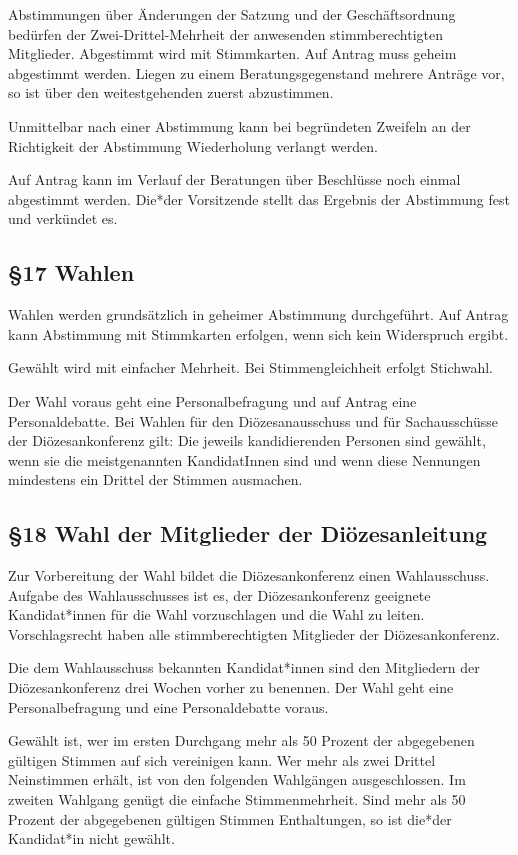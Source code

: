 \documentclass[12pt]{report}
\begin{document}
\begin{flushleft}
Abstimmungen über Änderungen der Satzung und der Geschäftsordnung bedürfen der
Zwei-Drittel-Mehrheit der anwesenden stimmberechtigten Mitglieder. Abgestimmt wird mit Stimmkarten.
Auf Antrag muss geheim abgestimmt werden.
Liegen zu einem Beratungsgegenstand mehrere Anträge vor, so ist über den weitestgehenden zuerst abzustimmen.

Unmittelbar nach einer Abstimmung kann bei begründeten Zweifeln an der Richtigkeit der Abstimmung 
Wiederholung verlangt werden.

Auf Antrag kann im Verlauf der Beratungen über Beschlüsse noch einmal abgestimmt werden.
Die*der Vorsitzende stellt das Ergebnis der Abstimmung fest und verkündet es.

\subsection*{§17 Wahlen}
Wahlen werden grundsätzlich in geheimer Abstimmung durchgeführt. Auf Antrag kann Abstimmung mit
Stimmkarten erfolgen, wenn sich kein Widerspruch ergibt.

Gewählt wird mit einfacher Mehrheit. Bei Stimmengleichheit erfolgt Stichwahl.

Der Wahl voraus geht eine Personalbefragung und auf Antrag eine Personaldebatte. Bei Wahlen für den 
Diözesanausschuss und für Sachausschüsse der Diözesankonferenz gilt: Die jeweils kandidierenden Personen
sind gewählt, wenn sie die meistgenannten KandidatInnen sind und wenn diese Nennungen mindestens ein
Drittel der Stimmen ausmachen.

\subsection*{§18 Wahl der Mitglieder der Diözesanleitung}
Zur Vorbereitung der Wahl bildet die Diözesankonferenz einen Wahlausschuss. Aufgabe des Wahlausschusses
ist es, der Diözesankonferenz geeignete Kandidat*innen für die Wahl vorzuschlagen und die Wahl zu leiten.
Vorschlagsrecht haben alle stimmberechtigten Mitglieder der Diözesankonferenz.

Die dem Wahlausschuss bekannten Kandidat*innen sind den Mitgliedern der Diözesankonferenz drei Wochen
vorher zu benennen. Der Wahl geht eine Personalbefragung und eine Personaldebatte voraus.

Gewählt ist, wer im ersten Durchgang mehr als 50 Prozent der abgegebenen gültigen Stimmen auf sich 
vereinigen kann. Wer mehr als zwei Drittel Neinstimmen erhält, ist von den folgenden Wahlgängen ausgeschlossen. 
Im zweiten Wahlgang genügt die einfache Stimmenmehrheit. Sind mehr als 50 Prozent der abgegebenen
gültigen Stimmen Enthaltungen, so ist die*der Kandidat*in nicht gewählt.


\end{flushleft}
\end{document}
